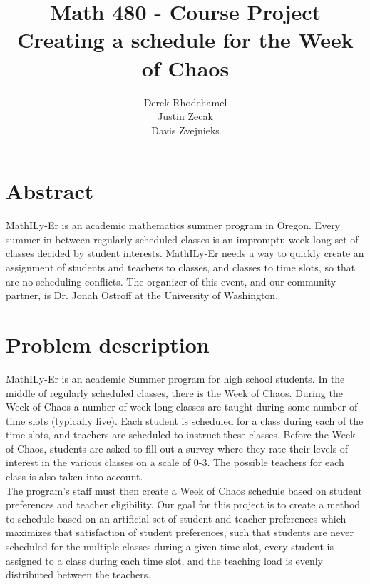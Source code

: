 \documentclass[11pt]{article}
\title{\textbf{Math 480 - Course Project}
			  \\Creating a schedule for the Week of Chaos}
\author{Derek Rhodehamel\\
		Justin Zecak\\
		Davis Zvejnieks}
\date{}
\begin{document}
\maketitle
\section{Abstract}
MathILy-Er is an academic mathematics summer program in Oregon. Every summer in between regularly scheduled classes is an impromptu week-long set of classes decided by student interests. MathILy-Er needs a way to quickly create an assignment of students and teachers to classes, and classes to time slots, so that are no scheduling conflicts. The organizer of this event, and our community partner, is Dr. Jonah Ostroff at the University of Washington.
\section{Problem description}
MathILy-Er is an academic Summer program for high school students.  In the middle of regularly scheduled classes, there is the Week of Chaos.  During the Week of Chaos a number of week-long classes are taught during some number of time slots (typically five). Each student is scheduled for a class during each of the time slots, and teachers are scheduled to instruct these classes.  Before the Week of Chaos, students are asked to fill out a survey where they rate their levels of interest in the various classes on a scale of 0-3. The possible teachers for each class is also taken into account.\\
\indent The program's staff must then create a Week of Chaos schedule based on student preferences and teacher eligibility. Our goal for this project is to create a method to schedule based on an artificial set of student and teacher preferences which maximizes that satisfaction of student preferences, such that students are never scheduled for the multiple classes during a given time slot, every student is assigned to a class during each time slot, and the teaching load is evenly distributed between the teachers.
\end{document}
